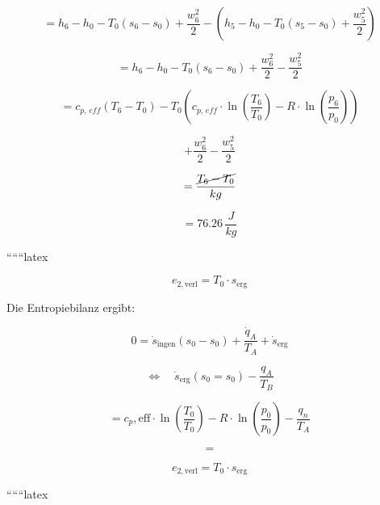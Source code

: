 \[
= h_6 - h_0 - T_0 \left( s_6 - s_0 \right) + \frac{w_6^2}{2} - \left( h_5 - h_0 - T_0 \left( s_5 - s_0 \right) + \frac{w_5^2}{2} \right)
\]

\[
= h_6 - h_0 - T_0 \left( s_6 - s_0 \right) + \frac{w_6^2}{2} - \frac{w_5^2}{2}
\]

\[
= c_{p, \, eff} \left( T_6 - T_0 \right) - T_0 \left( c_{p, \, eff} \cdot \ln \left( \frac{T_6}{T_0} \right) - R \cdot \ln \left( \frac{p_6}{p_0} \right) \right)
\]

\[
+ \frac{w_6^2}{2} - \frac{w_5^2}{2}
\]

\[
= \frac{\cancel{T_6 - T_0}}{kg}
\]

\[
= 76.26 \, \frac{J}{kg}
\]

``````latex


\[
e_{2,\text{verl}} = T_0 \cdot s_{\text{erg}}
\]

Die Entropiebilanz ergibt:

\[
0 = \dot{s}_{\text{ingen}} (s_0 - s_0) + \frac{\dot{q}_A}{T_A} + \dot{s}_{\text{erg}}
\]

\[
\Leftrightarrow \quad \dot{s}_{\text{erg}} (s_0 = s_0) - \frac{q_A}{T_B}
\]

\[
= c_p, \text{eff} \cdot \ln \left( \frac{T_0}{T_0} \right) - R \cdot \ln \left( \frac{p_0}{p_0} \right) - \frac{q_n}{T_A}
\]

\[
=
\]

\[
e_{2,\text{verl}} = T_0 \cdot s_{\text{erg}}
\]

``````latex


